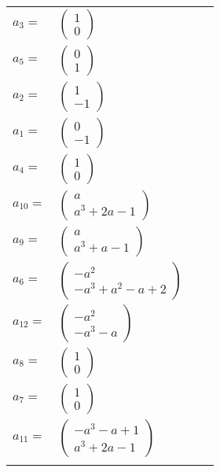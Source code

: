 \documentclass[1p]{elsarticle_modified}
\theoremstyle{definition}
\begin{document}
\begin{tabular}{m{7pt} m{180pt} m{7pt} m{180pt} }
\flushright $a_{3}=$&$\begin{pmatrix}1\\0\end{pmatrix}$ \\
\flushright $a_{5}=$&$\begin{pmatrix}0\\1\end{pmatrix}$ \\
\flushright $a_{2}=$&$\begin{pmatrix}1\\-1\end{pmatrix}$ \\
\flushright $a_{1}=$&$\begin{pmatrix}0\\-1\end{pmatrix}$ \\
\flushright $a_{4}=$&$\begin{pmatrix}1\\0\end{pmatrix}$ \\
\flushright $a_{10}=$&$\begin{pmatrix}a\\a^3+2 a-1\end{pmatrix}$ \\
\flushright $a_{9}=$&$\begin{pmatrix}a\\a^3+a-1\end{pmatrix}$ \\
\flushright $a_{6}=$&$\begin{pmatrix}- a^2\\- a^3+a^2- a+2\end{pmatrix}$ \\
\flushright $a_{12}=$&$\begin{pmatrix}- a^2\\- a^3- a\end{pmatrix}$ \\
\flushright $a_{8}=$&$\begin{pmatrix}1\\0\end{pmatrix}$ \\
\flushright $a_{7}=$&$\begin{pmatrix}1\\0\end{pmatrix}$ \\
\flushright $a_{11}=$&$\begin{pmatrix}- a^3- a+1\\a^3+2 a-1\end{pmatrix}$\\&\end{tabular}
\end{document}
